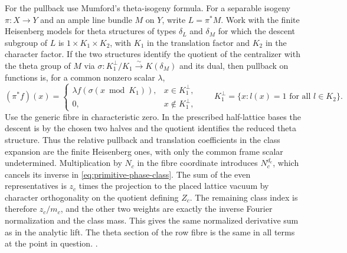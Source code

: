 For the pullback use Mumford's theta-isogeny formula. For a
separable isogeny \(\pi\colon X\to Y\) and an ample line bundle
\(M\) on \(Y\), write \(L=\pi^*M\). Work with the finite
Heisenberg models for theta structures of types \(\delta_L\)
and \(\delta_M\) for which the descent subgroup of \(L\) is
\(1\times K_1\times K_2\), with \(K_1\) in the translation
factor and \(K_2\) in the character factor. If the two
structures identify the quotient of the centralizer with the
theta group of \(M\) via
\(\sigma\colon K_1^\perp/K_1\xrightarrow{\sim}K(\delta_M)\)
and its dual, then pullback on functions is, for a common
nonzero scalar \(\lambda\),
\[
 (\pi^*f)(x)=
 \begin{cases}
   \lambda f(\sigma(x\bmod K_1)),&x\in K_1^\perp,\\
   0,&x\notin K_1^\perp,
 \end{cases}
 \qquad
 K_1^\perp=\{x:l(x)=1\text{ for all }l\in K_2\}.
\]
Use the generic fibre in characteristic zero. In the prescribed
half-lattice bases the descent is by the chosen two halves
and the quotient identifies the reduced theta structure.
Thus the relative pullback and translation coefficients in the
class expansion are the finite Heisenberg ones, with only the
common frame scalar undetermined.
\cite[\S1, Theorem~4, pp.~302--303]{mumford-theta-isogeny}
Multiplication by \(N_c\) in the fibre coordinate
introduces \(N_c^{d_c}\), which cancels its inverse in
\eqref{eq:primitive-phase-class}. The sum of the even
representatives is \(z_c\) times the projection to the
placed lattice vacuum by character orthogonality on the
quotient defining \(Z_c\). The remaining class index is
therefore \(z_c/m_c\), and the other two weights are
exactly the inverse Fourier normalization and the class
mass. This gives the same normalized derivative sum as in
the analytic lift. The theta section of the row fibre is the
same in all terms at the point in question.
.

